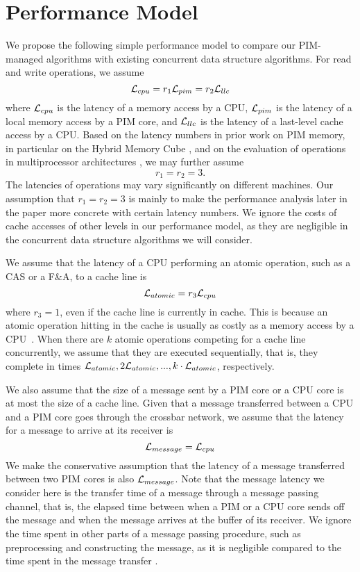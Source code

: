 \section{Performance Model}
\label{section:performance_model}
We propose the following simple performance model to compare 
our PIM-managed algorithms with existing concurrent data structure algorithms.
For read and write operations, we assume 
$$\mathcal{L}_{cpu} = r_1\mathcal{L}_{pim} = r_2\mathcal{L}_{llc}$$
where $\mathcal{L}_{cpu}$ is the latency of a memory access by a CPU,
$\mathcal{L}_{pim}$ is the latency of a local memory access by a PIM core, and
$\mathcal{L}_{llc}$ is the latency of a last-level cache access by a CPU.
Based on the latency numbers in prior work on PIM memory, 
in particular on the Hybrid Memory Cube \cite{website:HMC, Azarkhish16}, 
and on the evaluation of operations in multiprocessor architectures \cite{David13},
we may further assume 
$$r_1 = r_2 = 3.$$ 
The latencies of operations may vary significantly on different machines.  
Our assumption that $r_1 = r_2 = 3$ is mainly to make the performance analysis later in the paper 
more concrete with certain latency numbers. 
We ignore the costs of cache accesses of other levels in our performance model,
as they are negligible in the concurrent data structure algorithms we will consider.

We assume that the latency of a CPU performing an atomic operation, such as a CAS or a F\&A,
to a cache line is 
$$\mathcal{L}_{atomic} = r_3\mathcal{L}_{cpu}$$ 
where $r_3 = 1$, even if the cache line is currently in cache.
This is because an atomic operation hitting in the cache is usually 
as costly as a memory access by a CPU~\cite{David13}.
When there are $k$ atomic operations competing for a cache line concurrently,
we assume that they are executed sequentially, that is,
they complete in times $\mathcal{L}_{atomic}, 2\mathcal{L}_{atomic},..., k\cdot\mathcal{L}_{atomic}$, respectively.

We also assume that the size of a message sent by a PIM core or a CPU core is at most 
the size of a cache line.
Given that a message transferred between a CPU and a PIM core goes through
the crossbar network, we assume that the latency for a message to arrive at its receiver is 
$$\mathcal{L}_{message} = \mathcal{L}_{cpu}$$
We make the conservative assumption that the latency of a message transferred 
between two PIM cores is also $\mathcal{L}_{message}$.
Note that the message latency we consider here is the transfer time of a message
through a message passing channel, that is, the elapsed time between 
when a PIM or a CPU core sends off the message and when the message arrives at the buffer of its receiver.
We ignore the time spent in other parts of a message passing procedure,
such as preprocessing and constructing the message,
as it is negligible compared to the time spent in the message transfer \cite{Azarkhish16}.